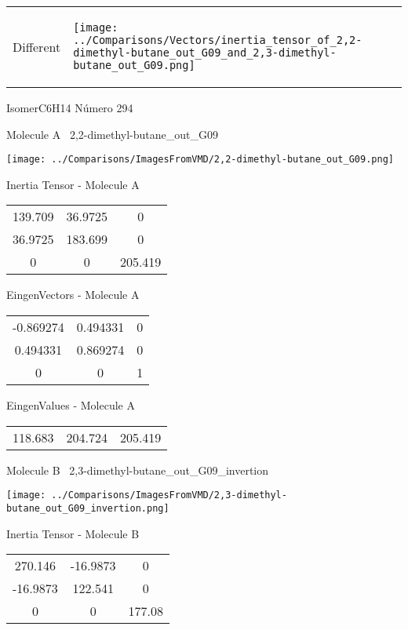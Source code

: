 \vtab[-5mm]
\begin{tabular}{*{2}{m{}}}
\begin{center}
\textcolor{NavyBlue}{\Large Different}
\end{center}
&
\begin{center}
\texttt{[image: ../Comparisons/Vectors/inertia\_tensor\_of\_2,2-dimethyl-butane\_out\_G09\_and\_2,3-dimethyl-butane\_out\_G09.png]}
\end{center}
\end{tabular}

 \newpage

\vtab[-3cm]
\begin{center}
{\large IsomerC6H14 \tab Número 294}
\end{center}
\begin{multicols}{2}
\begin{center}

Molecule A \
2,2-dimethyl-butane\_out\_G09

\texttt{[image: ../Comparisons/ImagesFromVMD/2,2-dimethyl-butane\_out\_G09.png]}

Inertia Tensor - Molecule A \\
\begin{tabular}{|c c c|}
139.709	 & 	36.9725	 & 	0	 \\
36.9725	 & 	183.699	 & 	0	 \\
0	 & 	0	 & 	205.419
\end{tabular}

\vtab
 EingenVectors - Molecule A     \\
\begin{tabular}{|c c c|}
-0.869274	 & 	0.494331	 & 	0	 \\
0.494331	 & 	0.869274	 & 	0	 \\
0	 & 	0	 & 	1
\end{tabular}

\vtab
 EingenValues - Molecule A     \\
\begin{tabular}{|c c c|}
118.683	 & 	204.724	 & 	205.419	 \\
\end{tabular}
\columnbreak

Molecule B \
2,3-dimethyl-butane\_out\_G09\_invertion

\texttt{[image: ../Comparisons/ImagesFromVMD/2,3-dimethyl-butane\_out\_G09\_invertion.png]}

Inertia Tensor - Molecule B \\
\begin{tabular}{|c c c|}
270.146	 & 	-16.9873	 & 	0	 \\
-16.9873	 & 	122.541	 & 	0	 \\
0	 & 	0	 & 	177.08
\end{tabular}


\end{center}
\end{multicols}

